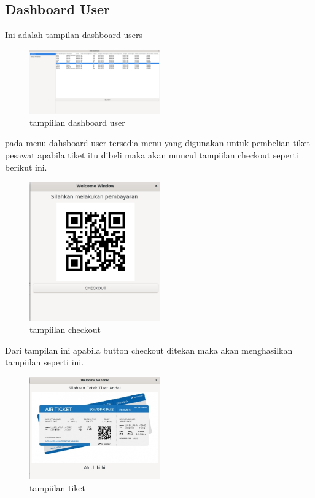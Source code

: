 \documentclass[a4paper,12pt]{article}
\begin{document}
\subsection{Dashboard User}
Ini adalah tampilan dashboard users
\begin{figure}[!htbp]
    \centering
    \includegraphics[width=0.5\textwidth]{./img/tampilan_dahboard_user.png}
    \caption{tampiilan dashboard user}
\end{figure}
\FloatBarrier
pada menu dahsboard user tersedia menu yang digunakan untuk pembelian tiket pesawat apabila tiket itu dibeli maka akan muncul tampiilan checkout seperti berikut ini.
\begin{figure}[!htbp]
    \centering
    \includegraphics[width=0.5\textwidth]{./img/checkout.png}
    \caption{tampiilan checkout}
\end{figure}
\FloatBarrier
Dari tampilan ini apabila button checkout ditekan maka akan menghasilkan tampiilan seperti ini.
\begin{figure}[!htbp]
    \centering
    \includegraphics[width=0.5\textwidth]{./img/tiket.png}
    \caption{tampiilan tiket}
\end{figure}
\end{document}
